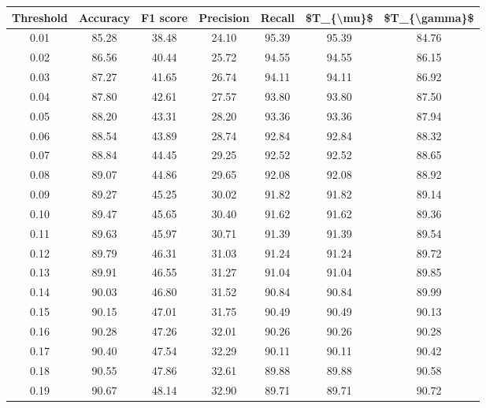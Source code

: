 \begin{tabular}{|c|c|c|c|c|c|c|}
\hline
 Threshold &  Accuracy &  F1 score &  Precision &  Recall &  \$T\_\{\textbackslash mu\}\$ &  \$T\_\{\textbackslash gamma\}\$ \\
\hline
      0.01 &     85.28 &     38.48 &      24.10 &   95.39 &      95.39 &         84.76 \\
      0.02 &     86.56 &     40.44 &      25.72 &   94.55 &      94.55 &         86.15 \\
      0.03 &     87.27 &     41.65 &      26.74 &   94.11 &      94.11 &         86.92 \\
      0.04 &     87.80 &     42.61 &      27.57 &   93.80 &      93.80 &         87.50 \\
      0.05 &     88.20 &     43.31 &      28.20 &   93.36 &      93.36 &         87.94 \\
      0.06 &     88.54 &     43.89 &      28.74 &   92.84 &      92.84 &         88.32 \\
      0.07 &     88.84 &     44.45 &      29.25 &   92.52 &      92.52 &         88.65 \\
      0.08 &     89.07 &     44.86 &      29.65 &   92.08 &      92.08 &         88.92 \\
      0.09 &     89.27 &     45.25 &      30.02 &   91.82 &      91.82 &         89.14 \\
      0.10 &     89.47 &     45.65 &      30.40 &   91.62 &      91.62 &         89.36 \\
      0.11 &     89.63 &     45.97 &      30.71 &   91.39 &      91.39 &         89.54 \\
      0.12 &     89.79 &     46.31 &      31.03 &   91.24 &      91.24 &         89.72 \\
      0.13 &     89.91 &     46.55 &      31.27 &   91.04 &      91.04 &         89.85 \\
      0.14 &     90.03 &     46.80 &      31.52 &   90.84 &      90.84 &         89.99 \\
      0.15 &     90.15 &     47.01 &      31.75 &   90.49 &      90.49 &         90.13 \\
      0.16 &     90.28 &     47.26 &      32.01 &   90.26 &      90.26 &         90.28 \\
      0.17 &     90.40 &     47.54 &      32.29 &   90.11 &      90.11 &         90.42 \\
      0.18 &     90.55 &     47.86 &      32.61 &   89.88 &      89.88 &         90.58 \\
      0.19 &     90.67 &     48.14 &      32.90 &   89.71 &      89.71 &         90.72 \\

\end{tabular}
